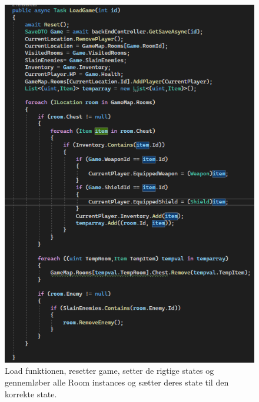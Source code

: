 \begin{figure}[H]
  \centering
  \includegraphics[]{02-Body/Implementering/GameEngineImplementering/Images/LoadFunction.png}
    \caption{Load funktionen, resetter game, setter de rigtige states og gennemløber
           alle Room instances og sætter deres state til den korrekte state.}
  \label{fig:LoadFunction}
\end{figure}


